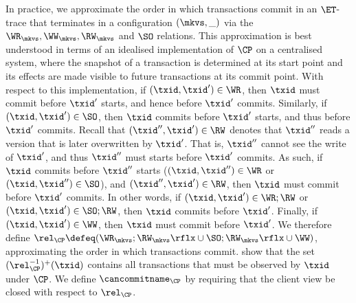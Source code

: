 In practice, we approximate the order in which transactions 
commit in an $\ET$-trace that terminates in a configuration $(\mkvs, \_)$ via the $\WR_{\mkvs}, \WW_{\mkvs}, \RW_{\mkvs}$ and $\SO$  relations. 
This approximation is best understood in terms of an idealised implementation of $\CP$ on a centralised system,
where the snapshot of a transaction is determined at its start point and its effects are made visible to future transactions at its commit point.
With respect to this implementation, if $(\txid,\txid') \in \WR$, then 
$\txid$ must commit before $\txid'$ starts, and hence before $\txid'$ commits.
Similarly, if $(\txid,\txid') \in \SO$, then $\txid$ commits before $\txid'$ starts, 
and thus before $\txid'$ commits.
% 
Recall that $(\txid'', \txid') \in \RW$
denotes that $\txid''$ reads a version that is later overwritten by $\txid'$.
That is, $\txid''$ cannot see the write of $\txid'$, and thus $\txid''$ must starts before 
$\txid'$ commits. 
As such, if $\txid$ commits before $\txid''$ starts 
($(\txid, \txid'') \in \WR$ or $(\txid,\txid'') \in \SO$), 
and $(\txid'', \txid') \in \RW$, then $\txid$ must commit before 
$\txid'$ commits. 
In other words, if $(\txid,\txid') \in \WR;\RW$ or $(\txid,\txid') \in \SO;\RW$, then $\txid$ commits before $\txid'$.
Finally, if $(\txid,\txid') \in\WW$, then $\txid$ must commit before $\txid'$. 
We therefore define $\rel_{\CP} \defeq (\WR_{\mkvs}; \RW_{\mkvs}\rflx \cup \SO;  \RW_{\mkvs}\rflx \cup \WW)$, approximating the order in which transactions commit. 
%
\citet{laws} show that the set $(\rel_{\CP}^{-1})^{+}(\txid)$ contains all transactions that must be observed by $\txid$ under $\CP$. 
We define $\cancommitname_{\CP}$ by requiring that the client view be 
closed with respect to $\rel_{\CP}$.

